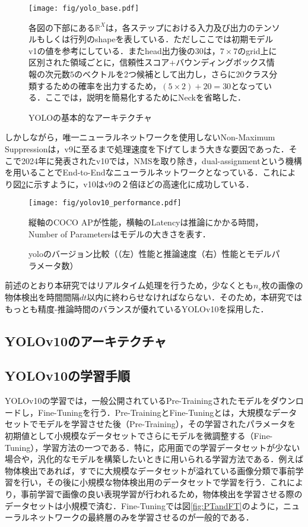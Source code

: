 \begin{figure}[t]
    \centering
    \texttt{[image: fig/yolo\_base.pdf]}
    \caption{YOLOの基本的なアーキテクチャ}
    \small
    各図の下部にある$\mathbb{R}^{X}$は，各ステップにおける入力及び出力のテンソルもしくは行列のshapeを表している．ただしここでは初期モデルv1の値を参考にしている．またhead出力後の$30$は，$7 \times 7$のgrid上に区別された領域ごとに，信頼性スコア+バウンディングボックス情報の次元数$5$のベクトルを2つ候補として出力し，さらに$20$クラス分類するための確率を出力するため，$(5 \times 2) + 20 = 30$となっている．ここでは，説明を簡易化するためにNeckを省略した．
    \label{fig:yolo_base}
\end{figure}

しかしながら，唯一ニューラルネットワークを使用しないNon-Maximum Suppressionは，v9に至るまで処理速度を下げてしまう大きな要因であった．そこで2024年に発表されたv10\cite{wang2024yolov10}では，NMSを取り除き，dual-assignmentという機構を用いることでEnd-to-Endなニューラルネットワークとなっている．これにより図\ref{fig:yolov10_performance}に示すように，v10はv9の２倍ほどの高速化に成功している．

\begin{figure}[t]
    \centering
    \texttt{[image: fig/yolov10\_performance.pdf]}
    \caption{yoloのバージョン比較（（左）性能と推論速度（右）性能とモデルパラメータ数）}
    \small
    縦軸の\textrm{COCO AP}が性能，横軸の\textrm{Latency}は推論にかかる時間，\textrm{Number of Parameters}はモデルの大きさを表す．
    \label{fig:yolov10_performance}
\end{figure}

前述のとおり本研究ではリアルタイム処理を行うため，少なくとも$n_s$枚の画像の物体検出を時間間隔$dt$以内に終わらせなければならない．そのため，本研究ではもっとも精度-推論時間のバランスが優れているYOLOv10を採用した．

\subsection{YOLOv10のアーキテクチャ}

\subsection{YOLOv10の学習手順}
YOLOv10の学習では，一般公開されているPre-Trainingされたモデルをダウンロードし，Fine-Tuningを行う．Pre-TrainingとFine-Tuningとは，大規模なデータセットでモデルを学習させた後（Pre-Training），その学習されたパラメータを初期値として小規模なデータセットでさらにモデルを微調整する（Fine-Tuning），学習方法の一つである\cite{radford2018improving}．特に，応用面での学習データセットが少ない場合や，汎化的なモデルを構築したいときに用いられる学習方法である．例えば物体検出であれば，すでに大規模なデータセットが溢れている画像分類で事前学習を行い，その後に小規模な物体検出用のデータセットで学習を行う．これにより，事前学習で画像の良い表現学習が行われるため，物体検出を学習させる際のデータセットは小規模で済む．Fine-Tuningでは図\ref{fig:PTandFT}のように，ニューラルネットワークの最終層のみを学習させるのが一般的である．

